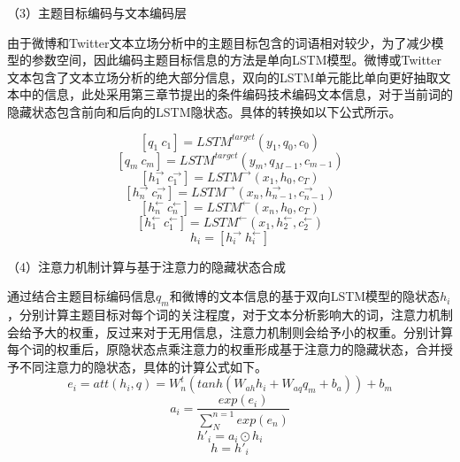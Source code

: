 （3）主题目标编码与文本编码层

由于微博和Twitter文本立场分析中的主题目标包含的词语相对较少，为了减少模型的参数空间，因此编码主题目标信息的方法是单向LSTM模型。微博或Twitter文本包含了文本立场分析的绝大部分信息，双向的LSTM单元能比单向更好抽取文本中的信息，此处采用第三章节提出的条件编码技术编码文本信息，对于当前词的隐藏状态包含前向和后向的LSTM隐状态。具体的转换如以下公式所示。


\begin{equation}\label{lstm_f}[q_1~c_1] = LSTM^{target}(y_1,q_0,c_0)\end{equation}
\begin{equation}\label{lstm_f}[q_m~c_m] = LSTM^{target}(y_m,q_{M-1},c_{m-1})\end{equation}
\begin{equation}\label{lstm_f}[h^{→}_{1}~c^{→}_{1}] = LSTM^{→}(x_1,h_0,c_T)\end{equation}
\begin{equation}\label{lstm_f}[h^{→}_{n}~c^{→}_{n}] = LSTM^{→}(x_n,h^{→}_{n-1},c^{→}_{n-1})\end{equation}
\begin{equation}\label{lstm_f}[h^{←}_{n}~c^{←}_{n}] = LSTM^{←}(x_n,h_0,c_T)\end{equation}
\begin{equation}\label{lstm_f}[h^{←}_{1}~c^{←}_{1}] = LSTM^{←}(x_1,h^{←}_{2},c^{←}_{2})\end{equation}
\begin{equation}\label{lstm_f}h_i= [h^{→}_i~h^{←}_i]\end{equation}

（4）注意力机制计算与基于注意力的隐藏状态合成

通过结合主题目标编码信息$q_m$和微博的文本信息的基于双向LSTM模型的隐状态$h_i$，分别计算主题目标对每个词的关注程度，对于文本分析影响大的词，注意力机制会给予大的权重，反过来对于无用信息，注意力机制则会给予小的权重。分别计算每个词的权重后，原隐状态点乘注意力的权重形成基于注意力的隐藏状态，合并授予不同注意力的隐状态，具体的计算公式如下。
\begin{equation}\label{conv1} e_i=att(h_i,q)=W^t_n(tanh(W_{ah}h_i+W_{aq}q_m+b_a))+b_m \end{equation}
\begin{equation}\label{conv1} a_i=\frac{exp(e_i)}{\sum_{N}^{n=1}exp(e_n)} \end{equation}
\begin{equation}\label{conv1} h'_i=a_i \odot h_i \end{equation}
\begin{equation}\label{conv1} h = h'_i \end{equation}

